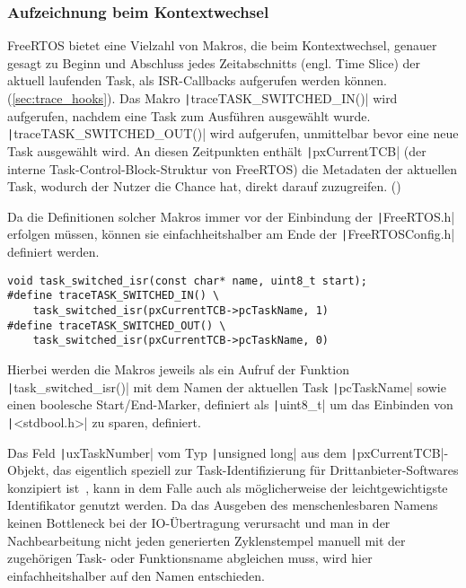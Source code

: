 \subsubsection{Aufzeichnung beim Kontextwechsel}

FreeRTOS bietet eine Vielzahl von Makros, die beim Kontextwechsel, genauer
gesagt zu Beginn und Abschluss jedes Zeitabschnitts (engl. Time Slice) der
aktuell laufenden Task, als ISR-Callbacks aufgerufen werden
können.(\ref{sec:trace_hooks}). Das Makro
\texttt|traceTASK_SWITCHED_IN()| wird aufgerufen, nachdem eine Task zum
Ausführen ausgewählt wurde. \texttt|traceTASK_SWITCHED_OUT()| wird
aufgerufen, unmittelbar bevor eine neue Task ausgewählt wird. An diesen
Zeitpunkten enthält \texttt|pxCurrentTCB| (der interne
Task-Control-Block-Struktur von FreeRTOS) die Metadaten der aktuellen Task,
wodurch der Nutzer die Chance hat, direkt darauf zuzugreifen.
(\cite{freertos_rtos_trace_hooks})

Da die Definitionen solcher Makros immer vor der Einbindung der
\texttt|FreeRTOS.h| erfolgen müssen, können sie einfachheitshalber
am Ende der \texttt|FreeRTOSConfig.h| definiert werden.

\begin{code}
\begin{verbatim}
void task_switched_isr(const char* name, uint8_t start);
#define traceTASK_SWITCHED_IN() \
    task_switched_isr(pxCurrentTCB->pcTaskName, 1)
#define traceTASK_SWITCHED_OUT() \
    task_switched_isr(pxCurrentTCB->pcTaskName, 0)
\end{verbatim}
\end{code}

Hierbei werden die Makros jeweils als ein Aufruf der Funktion
\texttt|task_switched_isr()| mit dem Namen der aktuellen Task
\texttt|pcTaskName| sowie einen boolesche Start/End-Marker, definiert
als \texttt|uint8_t| um das Einbinden von \texttt|<stdbool.h>|
zu sparen, definiert.

Das Feld \texttt|uxTaskNumber| vom Typ \texttt|unsigned long|
aus dem \texttt|pxCurrentTCB|-Objekt, das eigentlich speziell zur
Task-Identifizierung für Drittanbieter-Softwares konzipiert
ist~\cite{freertos_task_c_410}, kann in dem Falle auch als möglicherweise der
leichtgewichtigste Identifikator genutzt werden. Da das Ausgeben des
menschenlesbaren Namens keinen Bottleneck bei der IO-Übertragung verursacht und
man in der Nachbearbeitung nicht jeden generierten Zyklenstempel manuell mit der
zugehörigen Task- oder Funktionsname abgleichen muss, wird hier
einfachheitshalber auf den Namen entschieden.

